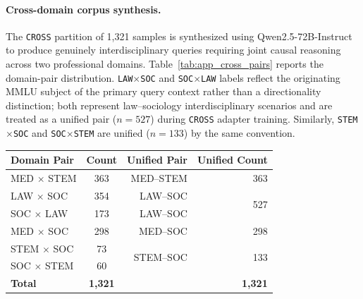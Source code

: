 \documentclass[a4paper,fleql,doubleblind]{cas-sc}
\begin{document}
\paragraph{Cross-domain corpus synthesis.}
The \texttt{CROSS} partition of 1,321 samples is synthesized using
Qwen2.5-72B-Instruct to produce genuinely interdisciplinary queries
requiring joint causal reasoning across two professional domains.
Table~\ref{tab:app_cross_pairs} reports the domain-pair distribution.
\texttt{LAW$\times$SOC} and \texttt{SOC$\times$LAW} labels reflect the
originating MMLU subject of the primary query context rather than a
directionality distinction; both represent law--sociology interdisciplinary
scenarios and are treated as a unified pair ($n{=}527$) during
\texttt{CROSS} adapter training. Similarly, \texttt{STEM$\times$SOC} and
\texttt{SOC$\times$STEM} are unified ($n{=}133$) by the same convention.

\vspace{6pt plus 4pt minus 3pt}
\begin{center}
\begingroup
{}
\label{tab:app_cross_pairs}
\renewcommand{\arraystretch}{1.8}
\begin{tabular}{lcrr}
\toprule
\textbf{Domain Pair} & \textbf{Count} & \textbf{Unified Pair} & \textbf{Unified Count} \\
\midrule
MED $\times$ STEM  & 363 & MED--STEM & 363 \\
\midrule
LAW $\times$ SOC   & 354 & LAW--SOC & \multirow{2}{*}{527} \\
SOC $\times$ LAW   & 173 & LAW--SOC & \\
\midrule
MED $\times$ SOC   & 298 & MED--SOC  & 298 \\
\midrule
STEM $\times$ SOC  &  73 & \multirow{2}{*}{STEM--SOC} & \multirow{2}{*}{133} \\
SOC $\times$ STEM  &  60 & & \\
\midrule
\textbf{Total} & \textbf{1,321} & & \textbf{1,321} \\
\bottomrule
\end{tabular}
\endgroup
\end{center}
\vspace{6pt plus 4pt minus 3pt}
\end{document}
